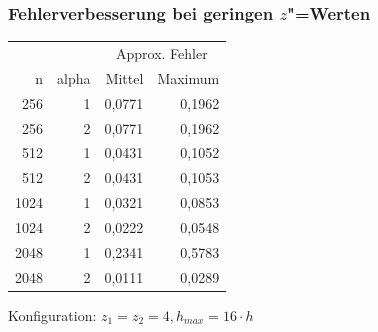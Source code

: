 \documentclass{beamer}
\begin{document}
\begin{frame}
    \frametitle{Fehlerverbesserung bei geringen \(z\)"=Werten}
    \begin{center}
    \begin{tabular}{|r|r|r|r|} \hline
    & & \multicolumn{2}{c|}{Approx. Fehler} \\
    n    & alpha & Mittel & Maximum \\ \hline \hline
    256  & 1     & 0,0771 & 0,1962  \\
    256  & 2     & 0,0771 & 0,1962  \\
    512  & 1     & 0,0431 & 0,1052  \\
    512  & 2     & 0,0431 & 0,1053  \\
    1024 & 1     & 0,0321 & 0,0853  \\
    1024 & 2     & 0,0222 & 0,0548  \\
    2048 & 1     & 0,2341 & 0,5783  \\
    2048 & 2     & 0,0111 & 0,0289  \\ \hline
    \end{tabular}
    \end{center}
    Konfiguration: \(z_1 = z_2 = 4, h_{max} = 16 \cdot h\)
\end{frame}
\end{document}
